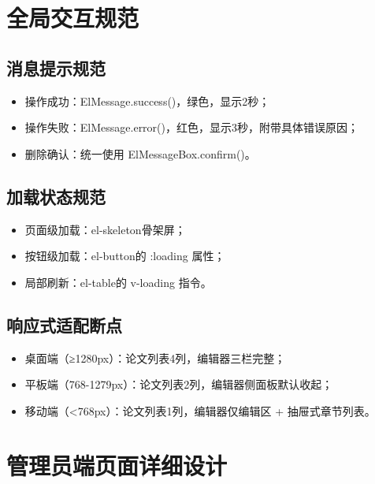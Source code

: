 \documentclass{../../softeng}
\begin{document}
\section{全局交互规范}

\subsection{消息提示规范}
\begin{itemize}
    \item 操作成功：ElMessage.success()，绿色，显示2秒；
    \item 操作失败：ElMessage.error()，红色，显示3秒，附带具体错误原因；
    \item 删除确认：统一使用 ElMessageBox.confirm()。
\end{itemize}

\subsection{加载状态规范}
\begin{itemize}
    \item 页面级加载：el-skeleton骨架屏；
    \item 按钮级加载：el-button的 :loading 属性；
    \item 局部刷新：el-table的 v-loading 指令。
\end{itemize}

\subsection{响应式适配断点}
\begin{itemize}
    \item 桌面端（≥1280px）：论文列表4列，编辑器三栏完整；
    \item 平板端（768-1279px）：论文列表2列，编辑器侧面板默认收起；
    \item 移动端（<768px）：论文列表1列，编辑器仅编辑区 + 抽屉式章节列表。
\end{itemize}

\section{管理员端页面详细设计}
\end{document}
